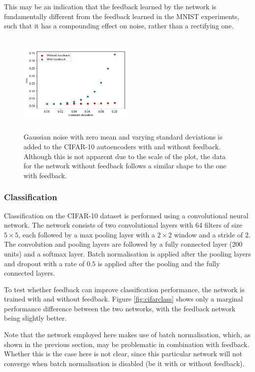 \documentclass{article}
\begin{document}
This may be an indication that the feedback learned by the network is fundamentally different from the feedback learned in the MNIST experiments, such that it has a compounding effect on noise, rather than a rectifying one. 

\begin{figure}
      \centering
      \includegraphics[width=0.5\textwidth,height=5cm,keepaspectratio]{img/cifar_actnoise.png}
      \caption{Gaussian noise with zero mean and varying standard deviations is added to the CIFAR-10 autoencoders with and without feedback. Although this is not apparent due to the scale of the plot, the data for the network without feedback follows a similar shape to the one with feedback.}
      \label{fig:cifarnoise}
  \end{figure}

\subsubsection{Classification} 
\label{cifarclass}
Classification on the CIFAR-10 dataset is performed using a convolutional neural network. The network consists of two convolutional layers with 64 filters of size $5 \times 5$, each followed by a max pooling \cite{zhou1988computation} layer with a $2\times2$ window and a stride of $2$. The convolution  and pooling layers are followed by a fully connected layer (200 units) and a softmax \cite{bridle1990probabilistic} layer. 
Batch normalisation is applied after the pooling layers and dropout with a rate of $0.5$ is applied after the pooling and the fully connected layers. 

To test whether feedback can improve classification performance, the network is trained with and without feedback. Figure \ref{fig:cifarclass} shows only a marginal performance difference between the two networks, with the feedback network being slightly better. 

Note that the network employed here makes use of batch normalisation, which, as shown in the previous section, may be problematic in combination with feedback. Whether this is the case here is not clear, since this particular network will not converge when batch normalisation is disabled (be it with or without feedback). 
\end{document}
